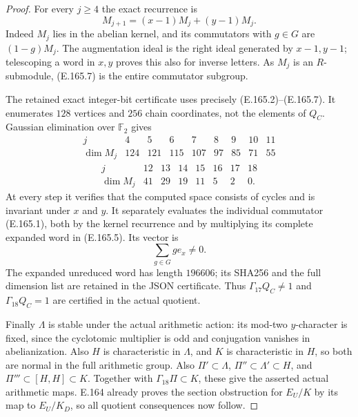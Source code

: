 \begin{proof}
For every $j\ge4$ the exact recurrence is
\[
             M_{j+1}=(x-1)M_j+(y-1)M_j.
\tag{E.165.7}
\]
Indeed $M_j$ lies in the abelian kernel, and its
commutators with $g\in G$ are $(1-g)M_j$.  The
augmentation ideal is the right ideal generated by
$x-1,y-1$; telescoping a word in $x,y$ proves this
also for inverse letters.  As $M_j$ is an $R$-submodule,
(E.165.7) is the entire commutator subgroup.

The retained exact integer-bit certificate
 uses precisely
(E.165.2)--(E.165.7).  It enumerates $128$ vertices and
$256$ chain coordinates, not the elements of $Q_C$.
Gaussian elimination over $\mathbb F_2$ gives
\[
\begin{array}{c|rrrrrrrr}
 j&4&5&6&7&8&9&10&11\\ \hline
 \dim M_j&124&121&115&107&97&85&71&55
\end{array}
\]
\[
\begin{array}{c|rrrrrrr}
 j&12&13&14&15&16&17&18\\ \hline
 \dim M_j&41&29&19&11&5&2&0.
\end{array}
\tag{E.165.8}
\]
At every step it verifies that the computed space consists
of cycles and is invariant under $x$ and $y$.
It separately evaluates the individual commutator
(E.165.1), both by the kernel recurrence and by multiplying
its complete expanded word in (E.165.5).  Its vector is
\[
                \sum_{g\in G}g e_x\ne0.
\tag{E.165.9}
\]
The expanded unreduced word has length $196606$;
its SHA256 and the full dimension list are retained
in the JSON certificate.  Thus $\Gamma_{17}Q_C\ne1$
and $\Gamma_{18}Q_C=1$ are certified in the actual quotient.

Finally $\Lambda$ is stable under the actual arithmetic
action: its mod-two $y$-character is fixed, since the
cyclotomic multiplier is odd and conjugation vanishes in
abelianization.  Also $H$ is characteristic in $\Lambda$, and $K$ is
characteristic in $H$, so both are normal in the full
arithmetic group.  Also $\Pi'\subset\Lambda$,
$\Pi''\subset\Lambda'\subset H$, and
$\Pi'''\subset[H,H]\subset K$.  Together with
$\Gamma_{18}\Pi\subset K$, these give the asserted
actual arithmetic maps.  E.164 already proves the
section obstruction for $E_U/K$ by its map to $E_U/K_D$,
so all quotient consequences now follow.
\end{proof}
